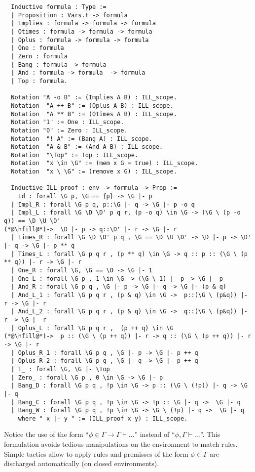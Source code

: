 \documentclass[runningheads,a4paper]{llncs}
\begin{document}
\begin{lstlisting}
  Inductive formula : Type := 
  | Proposition : Vars.t -> formula
  | Implies : formula -> formula -> formula 
  | Otimes : formula -> formula -> formula 
  | Oplus : formula -> formula -> formula 
  | One : formula 
  | Zero : formula 
  | Bang : formula -> formula
  | And : formula -> formula  -> formula 
  | Top : formula.

  Notation "A -o B" := (Implies A B) : ILL_scope.
  Notation  "A ++ B" := (Oplus A B) : ILL_scope.
  Notation  "A ** B" := (Otimes A B) : ILL_scope.
  Notation "1" := One : ILL_scope.
  Notation "0" := Zero : ILL_scope.
  Notation  "! A" := (Bang A) : ILL_scope.
  Notation  "A & B" := (And A B) : ILL_scope.
  Notation  "\Top" := Top : ILL_scope.
  Notation  "x \in \G" := (mem x G = true) : ILL_scope.
  Notation  "x \ \G" := (remove x G) : ILL_scope.
 
  Inductive ILL_proof : env -> formula -> Prop :=
    Id : forall \G p, \G == {p} -> \G |- p
  | Impl_R : forall \G p q, p::\G |- q -> \G |- p -o q
  | Impl_L : forall \G \D \D' p q r, (p -o q) \in \G -> (\G \ (p -o q)) == \D \U \D'
(*@\hfill@*)->  \D |- p -> q::\D' |- r -> \G |- r
  | Times_R : forall \G \D \D' p q , \G == \D \U \D' -> \D |- p -> \D' |- q -> \G |- p ** q
  | Times_L : forall \G p q r , (p ** q) \in \G -> q :: p :: (\G \ (p ** q)) |- r -> \G |- r
  | One_R : forall \G, \G == \O -> \G |- 1
  | One_L : forall \G p , 1 \in \G -> (\G \ 1) |- p -> \G |- p
  | And_R : forall \G p q , \G |- p -> \G |- q -> \G |- (p & q)
  | And_L_1 : forall \G p q r , (p & q) \in \G ->  p::(\G \ (p&q)) |- r -> \G |- r
  | And_L_2 : forall \G p q r , (p & q) \in \G ->  q::(\G \ (p&q)) |- r -> \G |- r
  | Oplus_L : forall \G p q r ,  (p ++ q) \in \G
(*@\hfill@*)->  p :: (\G \ (p ++ q)) |- r -> q :: (\G \ (p ++ q)) |- r -> \G |- r
  | Oplus_R_1 : forall \G p q , \G |- p -> \G |- p ++ q
  | Oplus_R_2 : forall \G p q , \G |- q -> \G |- p ++ q 
  | T_ : forall \G, \G |- \Top
  | Zero_ : forall \G p , 0 \in \G -> \G |- p
  | Bang_D : forall \G p q , !p \in \G -> p :: (\G \ (!p)) |- q -> \G |- q
  | Bang_C : forall \G p q , !p \in \G -> !p :: \G |- q ->  \G |- q
  | Bang_W : forall \G p q , !p \in \G -> \G \ (!p) |- q ->  \G |- q
    where " x |- y " := (ILL_proof x y) : ILL_scope.
\end{lstlisting}

Notice the use of the form ``$\phi\in\Gamma \to \Gamma\vdash\dots$''
instead of ``$\phi,\Gamma\vdash\dots$''. This formulation avoids
tedious manipulations on the environment to match rules. Simple
tactics allow to apply rules and premisses of the form $\phi\in\Gamma$
are discharged automatically (on closed environments).
\end{document}
